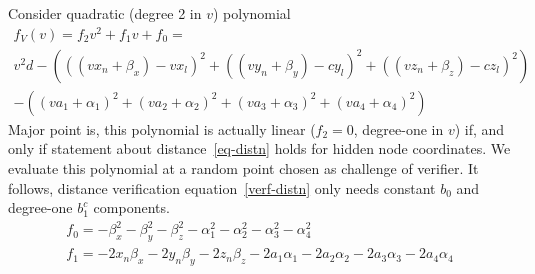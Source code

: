 \documentclass[a4paper,12pt]{article}
\begin{document}
Consider quadratic (degree 2 in $v$) polynomial
\begin{multline}
  f_V(v) = f_2 v^2 + f_1 v + f_0 = \\
  v^2 d - (((v x_n + \beta_x) - v x_l)^2 +
           ((v y_n + \beta_y) - c y_l)^2 +
           ((v z_n + \beta_z) - c z_l)^2)  \\
        - ((v a_1 + \alpha_1)^2 +
           (v a_2 + \alpha_2)^2 +
           (v a_3 + \alpha_3)^2 +
           (v a_4 + \alpha_4)^2)
\end{multline}
Major point is, this polynomial is actually linear ($f_2 = 0$, degree-one in $v$)
if, and only if
statement about distance~\eqref{eq-distn} holds for hidden node coordinates.
We evaluate this polynomial at a random point chosen as challenge of verifier.
It follows, distance verification equation~\eqref{verf-distn}
only needs constant $b_0$ and degree-one $b_1^c$ components.
\begin{gather}
  f_0 = -\beta_x^2 - \beta_y^2 - \beta_z^2 - \alpha_1^2 - \alpha_2^2 - \alpha_3^2 - \alpha_4^2 \\
  f_1 = -2 x_n \beta_x  -2 y_n \beta_y  -2 z_n \beta_z
        -2 a_1 \alpha_1 -2 a_2 \alpha_2 -2 a_3 \alpha_3 -2 a_4 \alpha_4
\end{gather}
\end{document}
